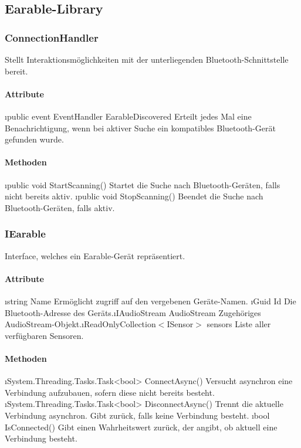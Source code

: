 \documentclass[../entwurf.tex]{subfiles}
\begin{document}
\subsection{Earable-Library}

\subsubsection{ConnectionHandler}
Stellt Interaktionsmöglichkeiten mit der unterliegenden Bluetooth-Schnittstelle bereit.
\paragraph{Attribute}
\begin{itemize}
	\i{public event EventHandler EarableDiscovered} Erteilt jedes Mal eine Benachrichtigung, wenn bei aktiver Suche ein kompatibles Bluetooth-Gerät gefunden wurde.
\end{itemize}
\paragraph{Methoden}
\begin{itemize}
	\i{public void StartScanning()} Startet die Suche nach Bluetooth-Geräten, falls nicht bereits aktiv.
	\i{public void StopScanning()} Beendet die Suche nach Bluetooth-Geräten, falls aktiv.
\end{itemize}


\subsubsection{IEarable}
Interface, welches ein Earable-Gerät repräsentiert.
\paragraph{Attribute}
\begin{itemize}
	\i{string Name} Ermöglicht zugriff auf den vergebenen Geräte-Namen.
	\i{Guid Id} Die Bluetooth-Adresse des Geräts.\footnotemark[1]
	\i{IAudioStream AudioStream} Zugehöriges AudioStream-Objekt.\footnotemark[1]
	\i{ReadOnlyCollection$<$ISensor$>$ sensors} Liste aller verfügbaren Sensoren.\footnotemark[1]
\end{itemize}
\paragraph{Methoden}
\begin{itemize}
	\i{System.Threading.Tasks.Task<bool> ConnectAsync()} Versucht asynchron eine Verbindung aufzubauen, sofern diese nicht bereits besteht.
	\i{System.Threading.Tasks.Task<bool> DisconnectAsync()} Trennt die aktuelle Verbindung asynchron. Gibt  zurück, falls keine Verbindung besteht.
	\i{bool IsConnected()} Gibt einen Wahrheitswert zurück, der angibt, ob aktuell eine Verbindung besteht.
\end{itemize}
\end{document}

